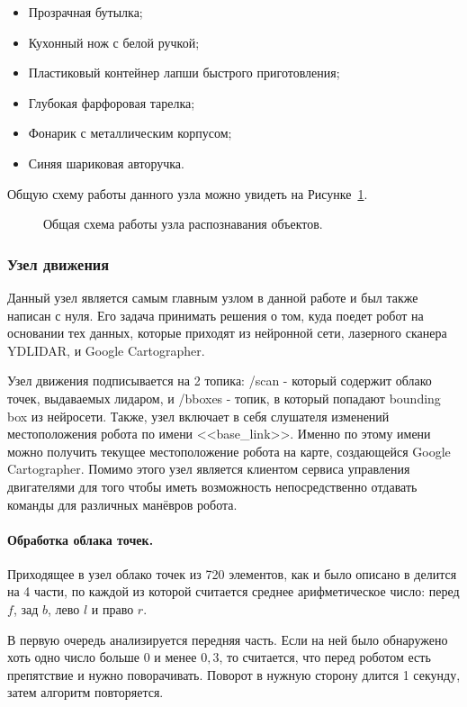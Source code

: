 \begin{itemize}
\item Прозрачная бутылка;
\item Кухонный нож с белой ручкой;
\item Пластиковый контейнер лапши быстрого приготовления;
\item Глубокая фарфоровая тарелка;
\item Фонарик с металлическим корпусом;
\item Синяя шариковая авторучка.

\end{itemize} 

Общую схему работы данного узла можно увидеть на Рисунке~\ref{fig:node-inference}.

\begin{figure}[ht]
  \caption{Общая схема работы узла распознавания объектов.}\label{fig:node-inference}
\end{figure}

\subsubsection{Узел движения}
Данный узел является самым главным узлом в данной работе и был также написан с нуля. Его задача принимать решения о том, куда поедет робот на основании тех данных, которые приходят из нейронной сети, лазерного сканера YDLIDAR, и Google Cartographer.

Узел движения подписывается на 2 топика: /scan - который содержит облако точек, выдаваемых лидаром, и /bboxes - топик, в который попадают bounding box из нейросети. Также, узел включает в себя слушателя изменений местоположения робота по имени <<base\_link>>. Именно по этому имени можно получить текущее местоположение робота на карте, создающейся Google Cartographer. Помимо этого узел является клиентом сервиса управления двигателями для того чтобы иметь возможность непосредственно отдавать команды для различных манёвров робота.

\paragraph{Обработка облака точек.} Приходящее в узел облако точек из 720 элементов, как и было описано в  делится на 4 части, по каждой из которой считается среднее арифметическое число: перед $f$, зад $b$, лево $l$ и право $r$. 

В первую очередь анализируется передняя часть. Если на ней было обнаружено хоть одно число больше $0$ и менее $0,3$, то считается, что перед роботом есть препятствие и нужно поворачивать. Поворот в нужную сторону длится 1 секунду, затем алгоритм повторяется.

